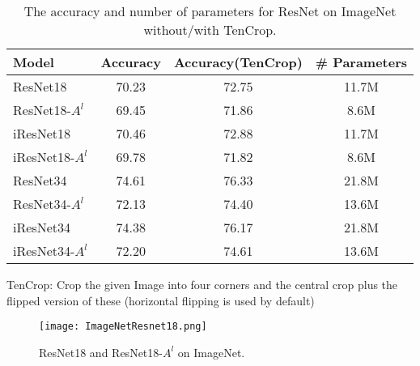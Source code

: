 \begin{table}[!h]
	\begin{center}
		\begin{tabular}{|l|c|c|c|}
			\hline
			Model   					& Accuracy	& Accuracy(TenCrop) & \# Parameters \\	
			\hline\hline
			ResNet18       				&  70.23  	& 72.75	  &  11.7M  		\\ 
			\hline
			ResNet18-$A^l$ 				&  69.45	& 71.86  &  8.6M   		\\ 
			\hline
			iResNet18       			&  70.46	& 72.88	  &  11.7M			\\ 
			\hline
			iResNet18-$A^l$ 			&  69.78	& 71.82  &  8.6M			\\ 
			\hline
			ResNet34       				&  74.61  & 76.33  &  21.8M	\\ 
			\hline
			ResNet34-$A^l$ 				&  72.13	& 74.40   &  13.6M    \\ 
			\hline
			iResNet34       			&  74.38	& 76.17  &  21.8M \\ 
			\hline
			iResNet34-$A^l$ 			&  72.20	& 74.61   &  13.6M \\ 
			\hline
		\end{tabular}
	\end{center}
	\caption{The accuracy and number of parameters for ResNet on ImageNet without/with TenCrop.}
\end{table}

TenCrop: Crop the given Image into four corners and the central crop plus the flipped version of these (horizontal flipping is used by default)






\begin{figure}[!htpt]
	\centering
	\texttt{[image: ImageNetResnet18.png]}
	\caption{ResNet18 and ResNet18-$A^l$ on ImageNet.}
	\label{}
\end{figure}
